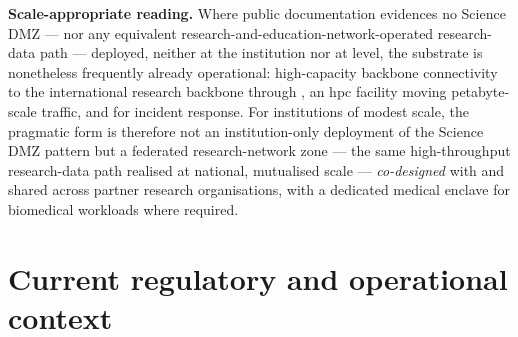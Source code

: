 \medskip
\noindent\textbf{Scale-appropriate reading.} Where public documentation
evidences no Science DMZ --- nor any equivalent research-and-education-network-operated
research-data path --- deployed, neither at the institution nor at
 level, the substrate is nonetheless frequently
already operational: high-capacity backbone connectivity to the
international research backbone through , an \gls{hpc} facility moving
petabyte-scale traffic, and  for incident
response. For institutions of modest scale, the pragmatic form is
therefore not an institution-only deployment of the Science DMZ pattern
but a federated research-network zone --- the same high-throughput
research-data path realised at national, mutualised scale ---
\emph{co-designed} with  and shared across
partner research organisations, with a dedicated medical enclave for
biomedical workloads where required.


\section{Current regulatory and operational context}

